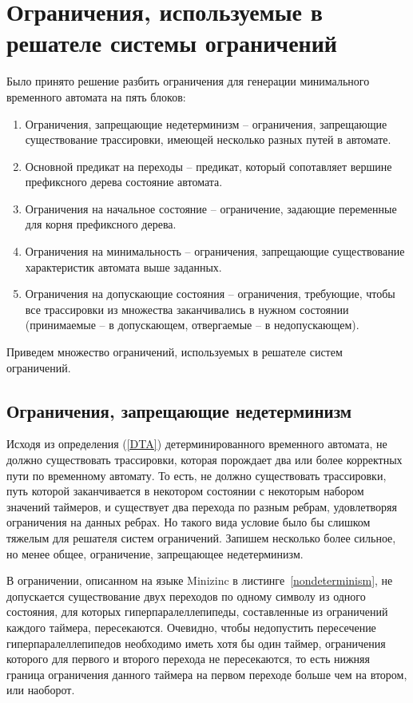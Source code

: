 \documentclass[times,specification,annotation]{itmo-student-thesis}
\begin{document}
\section{Ограничения, используемые в решателе системы ограничений}

Было принято решение разбить ограничения для генерации минимального временного автомата на пять блоков:
\begin{enumerate}
  \item Ограничения, запрещающие недетерминизм -- ограничения, запрещающие существование трассировки, имеющей несколько разных путей в автомате.
  \item Основной предикат на переходы -- предикат, который сопотавляет вершине префиксного дерева состояние автомата.
  \item Ограничения на начальное состояние -- ограничение, задающие переменные для корня префиксного дерева.
  \item Ограничения на минимальность -- ограничения, запрещающие существование характеристик автомата выше заданных.
  \item Ограничения на допускающие состояния -- ограничения, требующие, чтобы все трассировки из множества заканчивались в нужном состоянии (принимаемые -- в допускающем, отвергаемые -- в недопускающем).
\end{enumerate}
Приведем множество ограничений, используемых в решателе систем ограничений.

\subsection{Ограничения, запрещающие недетерминизм}

Исходя из определения (\ref{DTA}) детерминированного временного автомата, не должно существовать трассировки, которая порождает два или более корректных пути по временному автомату.
То есть, не должно существовать трассировки, путь которой заканчивается в некотором состоянии с некоторым набором значений таймеров, и существует два перехода по разным ребрам,
удовлетворяя ограничения на данных ребрах. Но такого вида условие было бы слишком тяжелым для решателя систем ограничений. Запишем несколько более сильное, но менее общее, ограничение, запрещающее
недетерминизм.

В ограничении, описанном на языке Minizinc в листинге~\ref{nondeterminism}, 
не допускается существование двух переходов по одному символу из одного состояния, для которых гиперпаралеллепипеды, составленные из ограничений каждого таймера,
пересекаются. Очевидно, чтобы недопустить пересечение гиперпаралеллепипедов необходимо иметь хотя бы один таймер, ограничения которого для первого и второго перехода не пересекаются, то есть
нижняя граница ограничения данного таймера на первом переходе больше чем на втором, или наоборот.
\end{document}
